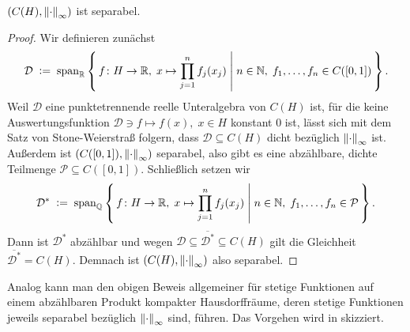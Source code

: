 \documentclass[../main/main.tex]{subfiles}
\begin{document}
	
	\begin{Hilfssatz}
		\label{lem:hilbertcubefunctionseparability}
		$(C(H), \left\lVert\cdot\right\rVert_\infty)$ ist separabel.
	\end{Hilfssatz}
	
	\begin{proof}
		Wir definieren zunächst 
		\[\mathcal{D} \; \vcentcolon = \; \mathrm{span}_{\mathbb{R}} 
		\left\{\, f \colon H \to \mathbb{R}, \; x
			 \mapsto \prod_{j=1}^{n} f_j(x_j)  \; \middle| \; n \in \mathbb{N}, \; f_1,
			\dots,f_n \in C([0, 1]) \,\right\} \text{.}\]
		Weil $\mathcal{D}$ eine punktetrennende reelle 
		Unteralgebra von $C(H)$ ist, für die keine 
		Auswertungsfunktion $\mathcal{D} \ni f \mapsto f(x), 
		\; x \in H$ konstant $0$ ist, lässt sich mit dem 
		Satz von Stone-Weierstraß folgern, dass $\mathcal{D} \subseteq C(H)$ 
		dicht bezüglich $\left\lVert\cdot\right\rVert_\infty$ ist.
		Außerdem ist $(C([0, 1]), \left\lVert\cdot\right\rVert_\infty)$ separabel, 
		also gibt es eine abzählbare, dichte Teilmenge 
		$\mathcal{P} \subseteq C([0, 1])$. Schließlich setzen wir
		\[\mathcal{D}^\ast \; \vcentcolon = \; \mathrm{span}_{\mathbb{Q}} 
		\left\{\, f \colon H \to \mathbb{R}, \; x \mapsto \prod_{j=1}^{n} f_j(x_j)  \; \middle| \; n \in \mathbb{N}, \; f_1,\dots,f_n \in \mathcal{P} \,\right\} \text{.}\]
		Dann ist $\mathcal{D}^\ast$ abzählbar und wegen 
		$ \mathcal{D} \subseteq \overline{\mathcal{D}^\ast} 
		\subseteq C(H)$ gilt die Gleichheit $\overline{\mathcal{D}^\ast} = C(H)$. 
		Demnach ist $(C(H), \left\lVert\cdot\right\rVert_\infty)$ also separabel.
	\end{proof}
	
	\begin{Bemerkung}
		Analog kann man den obigen Beweis allgemeiner für stetige Funktionen 
		auf einem abzählbaren Produkt kompakter Hausdorffräume, deren 
		stetige Funktionen jeweils separabel bezüglich $\left\lVert\cdot\right\rVert_\infty$ 
		sind, führen. Das Vorgehen wird in \cite[Lemma 4.12.1 und 
		Proposition 4.12.2]{Simon.2015} skizziert.
	\end{Bemerkung}
	
\end{document}
